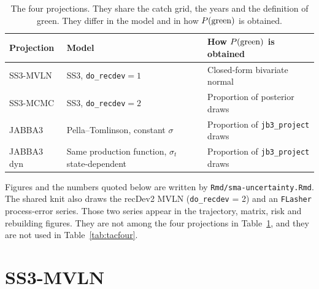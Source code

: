 \documentclass[11pt,a4paper]{article}
\begin{document}
\begin{table}[htbp]
\caption{\label{tab:four}The four projections. They share the catch grid, the
years and the definition of green. They differ in the model and in how
$P(\mathrm{green})$ is obtained.}
\centering
\begin{tabular}[t]{>{\raggedright\arraybackslash}p{}>{\raggedright\arraybackslash}p{}>{\raggedright\arraybackslash}p{}}
\toprule
Projection & Model & How $P(\mathrm{green})$ is obtained\\
\midrule
SS3-MVLN & SS3, \texttt{do\_recdev}${}=1$ & Closed-form bivariate normal\\
SS3-MCMC & SS3, \texttt{do\_recdev}${}=2$ & Proportion of posterior draws\\
JABBA3 & Pella--Tomlinson, constant $\sigma$ & Proportion of \texttt{jb3\_project} draws\\
JABBA3 dyn & Same production function, $\sigma_t$ state-dependent & Proportion of \texttt{jb3\_project} draws\\
\bottomrule
\end{tabular}
\end{table}

Figures and the numbers quoted below are written by
\texttt{Rmd/sma-uncertainty.Rmd}. The shared knit also draws the recDev2
MVLN (\texttt{do\_recdev} = 2) and an \texttt{FLasher} process-error
series. Those two series appear in the trajectory, matrix, risk and
rebuilding figures. They are not among the four projections in
Table~\ref{tab:four}, and they are not used in Table~\ref{tab:tacfour}.

\section{SS3-MVLN}
\label{sec:mvln}
\end{document}
